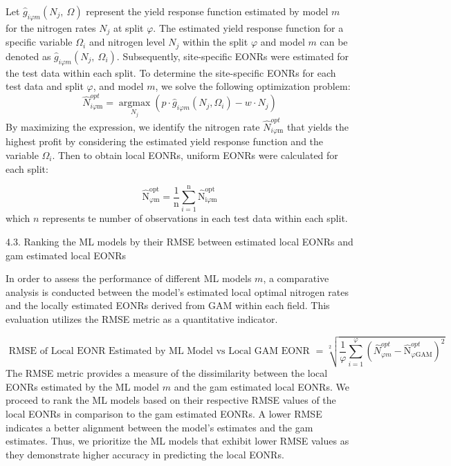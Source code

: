 \documentclass[
  12pt,
]{article}
\begin{document}
Let \({\hat{g}}_{i\varphi m}(N_j,\ \Omega)\) represent the yield response function estimated by model \(m\) for the nitrogen rates \(N_j\) at split \(\varphi\). The estimated yield response function for a specific variable \(\Omega_i\) and nitrogen level \(N_j\) within the split \(\varphi\) and model \(m\) can be denoted as \({\hat{g}}_{i\varphi m}(N_j,\ \Omega_i)\). Subsequently, site-specific EONRs were estimated for the test data within each split.
To determine the site-specific EONRs for each test data and split \(\varphi\), and model \(m\), we solve the following optimization problem:
\[
\widehat{N}_{i \varphi\mathrm{m}}^{o p t}=\underset{N_j}{\operatorname{argmax}}\left(p \cdot \hat{g}_{i \varphi m}\left(N_j, \Omega_i\right)-w \cdot N_j\right)
\]
By maximizing the expression, we identify the nitrogen rate \(\widehat{N}_{i \varphi\mathrm{m}}^{o p t}\) that yields the highest profit by considering the estimated yield response function and the variable \(\Omega_i\).
Then to obtain local EONRs, uniform EONRs were calculated for each split:

\[
\widehat{\mathrm{N}}_{\varphi \mathrm{m}}^{\mathrm{opt}}=\frac{1}{\mathrm{n}} \sum_{i=1}^{\mathrm{n}} \widehat{\mathrm{N}}_{\mathrm{i} \varphi \mathrm{m}}^{\mathrm{opt}}
\]
which \(n\) represents te number of observations in each test data within each split.

4.3. Ranking the ML models by their RMSE between estimated local EONRs and gam
estimated local EONRs

In order to assess the performance of different ML models \(m\), a comparative analysis is conducted between the model's estimated local optimal nitrogen rates and the locally estimated EONRs derived from GAM within each field. This evaluation utilizes the RMSE metric as a quantitative indicator.

\[
\text { RMSE of Local EONR Estimated by ML Model vs Local GAM EONR }=\sqrt[2]{\frac{1}{\varphi} \sum_{i=1}^{\varphi}\left(\widehat{N}_{\varphi m}^{o p t}-\widehat{\mathrm{N}}_{\varphi \mathrm{GAM}}^{o p t}\right)^2}
\]
The RMSE metric provides a measure of the dissimilarity between the local EONRs estimated by the ML model \(m\) and the gam estimated local EONRs.
We proceed to rank the ML models based on their respective RMSE values of the local EONRs in comparison to the gam estimated EONRs. A lower RMSE indicates a better alignment between the model's estimates and the gam estimates. Thus, we prioritize the ML models that exhibit lower RMSE values as they demonstrate higher accuracy in predicting the local EONRs.
\end{document}
